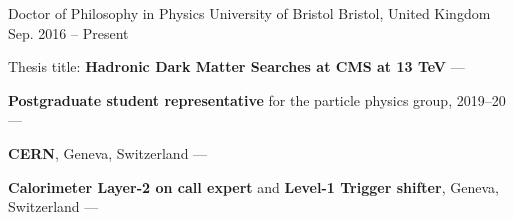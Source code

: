 
\newcommand{\vpaddingEdu}{\vspace{0.5mm}}

\begin{cventries}
    \cventry
        {Doctor of Philosophy in Physics} %
        {University of Bristol} %
        {Bristol, United Kingdom} %
        {Sep. 2016 -- Present} %
        {
        \begin{cvitems} %
            \item {Thesis title: \textbf{Hadronic Dark Matter Searches at CMS at 13 TeV} --- }
            \vpaddingEdu
            \item {\textbf{Postgraduate student representative} for the particle physics group, 2019--20 --- } %
            \vpaddingEdu
            \item {\textbf{CERN}, Geneva, Switzerland --- }
            \item {\textbf{Calorimeter Layer-2 on call expert} and \textbf{Level-1 Trigger shifter}, Geneva, Switzerland --- }
        \end{cvitems}
        }


\end{cventries}
